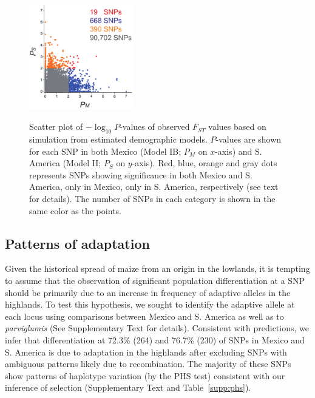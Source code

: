 \begin{figure}[tb]   
  \begin{center}
   \vspace{-0mm}
   \includegraphics[width=0.4\textwidth]{fig/Fig6}
   \renewcommand{\baselinestretch}{0.9}
   \vspace{-3mm}
   \caption{Scatter plot of $-\log_10 P$-values of observed $F_{ST}$ values based on simulation from estimated demographic models. $P$-values are shown for each SNP in both Mexico (Model IB; $P_M$ on $x$-axis) and S. America (Model II; $P_S$ on $y$-axis).  
   Red, blue, orange and gray dots represents SNPs showing significance in both Mexico and S. America, only in Mexico, only in S. America, respectively (see text for details).
   The number of SNPs in each category is shown in the same color as the points.} 
\vspace{-6mm}
    \label{PvDist}
  \end{center}
\end{figure}
%

\subsection*{Patterns of adaptation}

Given the historical spread of maize from an origin in the lowlands, it is tempting to assume that the observation of significant population differentiation at a SNP should be primarily due to an increase in frequency of adaptive alleles in the highlands.
To test this hypothesis, we sought to identify the adaptive allele at each locus using comparisons between Mexico and S. America as well as to \emph{parviglumis} (See Supplementary Text  for details).  
Consistent with predictions, we infer that differentiation at 72.3\% (264) and 76.7\% (230) of SNPs in Mexico and S. America is due to adaptation in the highlands after excluding  SNPs with ambiguous patterns likely due to recombination. 
The majority of these SNPs show patterns of haplotype variation (by the PHS test) consistent with our inference of selection (Supplementary Text and Table~\ref{supp:phs}).
   
